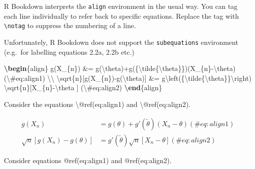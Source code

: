 \documentclass[
  letterpaper,
]{article}
\newenvironment{Shaded}{\begin{snugshade}}{\end{snugshade}}
\newcommand{\ExtensionTok}[1]{\textcolor[rgb]{0.00,0.23,0.31}{#1}}
\newcommand{\FunctionTok}[1]{\textcolor[rgb]{0.28,0.35,0.67}{#1}}
\newcommand{\KeywordTok}[1]{\textcolor[rgb]{0.00,0.23,0.31}{\textbf{#1}}}
\newcommand{\NormalTok}[1]{\textcolor[rgb]{0.00,0.23,0.31}{#1}}
\newcommand{\SpecialCharTok}[1]{\textcolor[rgb]{0.37,0.37,0.37}{#1}}
\newcommand{\SpecialStringTok}[1]{\textcolor[rgb]{0.13,0.47,0.30}{#1}}
\numberwithin{equation}{section}
\numberwithin{figure}{section}
\theoremstyle{break}
\begin{document}
R Bookdown interprets the \texttt{align} environment in the usual way.
You can tag each line individually to refer back to specific equations.
Replace the tag with \texttt{\textbackslash{}notag} to suppress the
numbering of a line.

Unfortunately, R Bookdown does not support the \texttt{subequations}
environment (e.g.~for labelling equations 2.2a, 2.2b etc.)

\begin{Shaded}
\begin{Highlighting}[]
\KeywordTok{\textbackslash{}begin}\NormalTok{\{}\ExtensionTok{align}\NormalTok{\}}
\SpecialStringTok{g(X\_\{n\}) \&= g(}\SpecialCharTok{\textbackslash{}theta}\SpecialStringTok{)+g\textquotesingle{}(\{}\SpecialCharTok{\textbackslash{}tilde}\SpecialStringTok{\{}\SpecialCharTok{\textbackslash{}theta}\SpecialStringTok{\}\})(X\_\{n\}{-}}\SpecialCharTok{\textbackslash{}theta}\SpecialStringTok{) (}\SpecialCharTok{\textbackslash{}\#}\SpecialStringTok{eq:align1) }\SpecialCharTok{\textbackslash{}\textbackslash{}}
\SpecialCharTok{\textbackslash{}sqrt}\SpecialStringTok{\{n\}[g(X\_\{n\}){-}g(}\SpecialCharTok{\textbackslash{}theta}\SpecialStringTok{)] \&= g\textquotesingle{}}\SpecialCharTok{\textbackslash{}left}\SpecialStringTok{(\{}\SpecialCharTok{\textbackslash{}tilde}\SpecialStringTok{\{}\SpecialCharTok{\textbackslash{}theta}\SpecialStringTok{\}\}}\SpecialCharTok{\textbackslash{}right}\SpecialStringTok{)}
\SpecialStringTok{  }\SpecialCharTok{\textbackslash{}sqrt}\SpecialStringTok{\{n\}[X\_\{n\}{-}}\SpecialCharTok{\textbackslash{}theta}\SpecialStringTok{ ] }
\SpecialStringTok{(}\SpecialCharTok{\textbackslash{}\#}\SpecialStringTok{eq:align2)}
\KeywordTok{\textbackslash{}end}\NormalTok{\{}\ExtensionTok{align}\NormalTok{\}}
  
\NormalTok{Consider the equations }\FunctionTok{\textbackslash{}@ref}\NormalTok{(eq:align1) and }\FunctionTok{\textbackslash{}@ref}\NormalTok{(eq:align2).}
\end{Highlighting}
\end{Shaded}

\begin{align}
g(X_{n}) &= g(\theta)+g'({\tilde{\theta}})(X_{n}-\theta) (\#eq:align1) \\
\sqrt{n}[g(X_{n})-g(\theta)] &= g'\left({\tilde{\theta}}\right)
  \sqrt{n}[X_{n}-\theta ] 
(\#eq:align2)
\end{align}

Consider equations @ref(eq:align1) and @ref(eq:align2).
\end{document}
